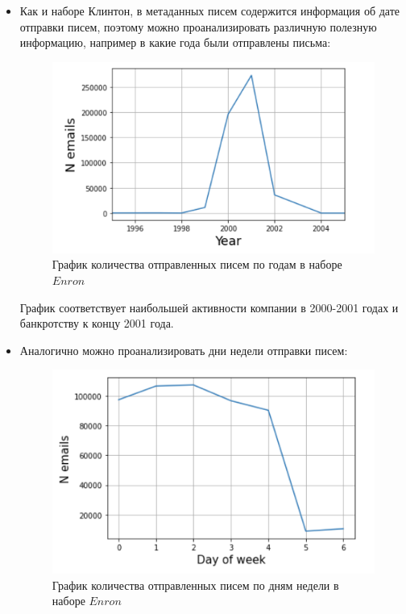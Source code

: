 \begin{itemize}

\item Как и наборе Клинтон, в метаданных писем содержится информация об дате отправки писем,
поэтому можно проанализировать различную полезную информацию, например в какие года
были отправлены письма:

\begin{figure}[H]
\centering
\includegraphics[scale=0.7]{pics/enron_year.png}
\caption{График количества отправленных писем по годам в наборе $Enron$}
\end{figure}

График соответствует наибольшей активности компании в 2000-2001 годах и банкротству к концу 2001 года.

\item Аналогично можно проанализировать дни недели отправки писем:

\begin{figure}[H]
\centering
\includegraphics[scale=0.7]{pics/enron_week.png}
\caption{График количества отправленных писем по дням недели в наборе $Enron$}
\end{figure}



\end{itemize}
